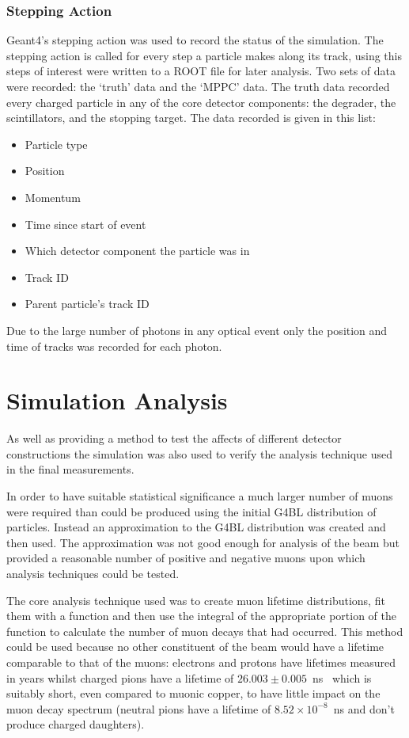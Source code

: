 \subsubsection{Stepping Action} %
\label{sub:stepping_action}
Geant4's stepping action was used to record the status of the simulation. The stepping action is called for every step a particle makes along its track, using this steps of interest were written to a ROOT file for later analysis. Two sets of data were recorded: the `truth' data and the `MPPC' data. The truth data recorded every charged particle in any of the core detector components: the degrader, the scintillators, and the stopping target. The data recorded is given in this list:
\begin{itemize}
  \item Particle type
  \item Position
  \item Momentum
  \item Time since start of event
  \item Which detector component the particle was in
  \item Track ID
  \item Parent particle's track ID
\end{itemize}
Due to the large number of photons in any optical event only the position and time of tracks was recorded for each photon.

\section{Simulation Analysis} %
\label{cha:simulation_analysis}

As well as providing a method to test the affects of different detector constructions the simulation was also used to verify the analysis technique used in the final measurements. 

In order to have suitable statistical significance a much larger number of muons were required than could be produced using the initial G4BL distribution of particles. Instead an approximation to the G4BL distribution was created and then used. The approximation was not good enough for analysis of the beam but provided a reasonable number of positive and negative muons upon which analysis techniques could be tested. 

The core analysis technique used was to create muon lifetime distributions, fit them with a function and then use the integral of the appropriate portion of the function to calculate the number of muon decays that had occurred. This method could be used because no other constituent of the beam would have a lifetime comparable to that of the muons: electrons and protons have lifetimes measured in years whilst charged pions have a lifetime of \(26.003\pm0.005\)~ns~\cite{PDG} which is suitably short, even compared to muonic copper, to have little impact on the muon decay spectrum (neutral pions have a lifetime of \( 8.52\times10^{-8}\)~ns and don't produce charged daughters).

